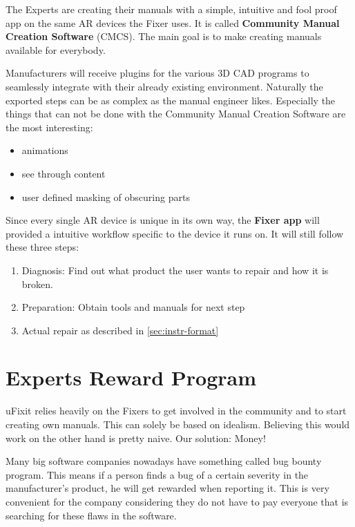 		The Experts are creating their manuals with a simple, intuitive and fool proof app on the same AR devices the Fixer uses. It is called \textbf{Community Manual Creation Software} (CMCS). The main goal is to make creating manuals available for everybody.
		
		Manufacturers will receive plugins for the various 3D CAD programs to seamlessly integrate with their already existing environment. Naturally the exported steps can be as complex as the manual engineer likes. Especially the things that can not be done with the Community Manual Creation Software are the most interesting:
		
		\begin{itemize}
			\itemsep0em
			\item animations
			\item see through content
			\item user defined masking of obscuring parts
		\end{itemize}
		
		Since every single AR device is unique in its own way, the \textbf{Fixer app} will provided a intuitive workflow specific to the device it runs on. It will still follow these three steps:
		
		\begin{enumerate}
			\itemsep0em
			\item Diagnosis: Find out what product the user wants to repair and how it is broken.
			\item Preparation: Obtain tools and manuals for next step
			\item Actual repair as described in \eqref{sec:instr-format}
		\end{enumerate}
		
		
	\section{Experts Reward Program}
	
		uFixit relies heavily on the Fixers to get involved in the community and to start creating own manuals. This can solely be based on idealism. Believing this would work on the other hand is pretty naive. Our solution: Money!
		
		Many big software companies nowadays have something called bug bounty program. This means if a person finds a bug of a certain severity in the manufacturer’s product, he will get rewarded when reporting it. This is very convenient for the company considering they do not have to pay everyone that is searching for these flaws in the software.
		
